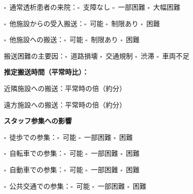 \documentclass[a4paper,12pt]{jarticle}
\newcommand{\checkbox}{$\square$\ }
\newcommand{\underlinespace}[1]{\underline{\hspace{#1}}}
\begin{document}
\noindent
\checkbox 通常透析患者の来院：\checkbox 支障なし \quad \checkbox 一部困難 \quad \checkbox 大幅困難

\vspace{3mm}

\noindent
\checkbox 他施設からの受入搬送：\checkbox 可能 \quad \checkbox 制限あり \quad \checkbox 困難

\vspace{3mm}

\noindent
\checkbox 他施設への搬送：\checkbox 可能 \quad \checkbox 制限あり \quad \checkbox 困難

\vspace{2mm}

\noindent
搬送困難の主要因：\checkbox 道路損壊 \quad \checkbox 交通規制 \quad \checkbox 渋滞 \quad \checkbox 車両不足

\vspace{3mm}

\noindent
\textbf{推定搬送時間（平常時比）：}

\vspace{2mm}

\noindent
近隣施設への搬送：平常時の\underlinespace{2cm}倍（約\underlinespace{2cm}分）

\vspace{2mm}

\noindent
遠方施設への搬送：平常時の\underlinespace{2cm}倍（約\underlinespace{2cm}分）

\vspace{8mm}

\begin{center}
\textbf{\large スタッフ参集への影響}
\end{center}

\vspace{3mm}

\noindent
\checkbox 徒歩での参集：\checkbox 可能 \quad \checkbox 一部困難 \quad \checkbox 困難

\vspace{3mm}

\noindent
\checkbox 自転車での参集：\checkbox 可能 \quad \checkbox 一部困難 \quad \checkbox 困難

\vspace{3mm}

\noindent
\checkbox 自動車での参集：\checkbox 可能 \quad \checkbox 一部困難 \quad \checkbox 困難

\vspace{3mm}

\noindent
\checkbox 公共交通での参集：\checkbox 可能 \quad \checkbox 一部困難 \quad \checkbox 困難
\end{document}
